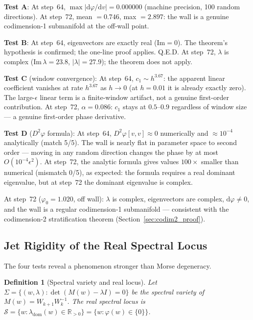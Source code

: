 \documentclass[11pt]{amsart}
\newtheorem{definition}[theorem]{Definition}
\begin{document}
\textbf{Test A}: At step~64, $\max|\mathrm{d}\varphi/\mathrm{d}v| = 0.000000$
(machine precision, 100 random directions).
At step~72, mean $= 0.746$, max $= 2.897$: the wall is a genuine
codimension-1 submanifold at the off-wall point.

\textbf{Test B}: At step~64, eigenvectors are exactly real ($\mathrm{Im} = 0$).
The theorem's hypothesis is confirmed; the one-line proof applies. Q.E.D.
At step~72, $\lambda$ is complex ($\mathrm{Im}\,\lambda = 23.8$, $|\lambda| = 27.9$);
the theorem does not apply.

\textbf{Test C} (window convergence): At step~64, $c_1 \sim h^{3.67}$:
the apparent linear coefficient vanishes at rate $h^{3.67}$ as $h \to 0$
(at $h = 0.01$ it is already exactly zero).
The large-$\epsilon$ linear term is a finite-window artifact, not a genuine
first-order contribution.
At step~72, $\alpha = 0.086$: $c_1$ stays at $0.5$--$0.9$ regardless of window
size --- a genuine first-order phase derivative.

\textbf{Test D} ($D^2\varphi$ formula): At step~64, $D^2\varphi[v,v] \approx 0$
numerically and $\approx 10^{-4}$ analytically (match 5/5).
The wall is nearly flat in parameter space to second order --- moving in any
random direction changes the phase by at most $O(10^{-4}\epsilon^2)$.
At step~72, the analytic formula gives values $100\times$ smaller than
numerical (mismatch 0/5), as expected: the formula requires a real dominant
eigenvalue, but at step~72 the dominant eigenvalue is complex.

At step~72 ($\varphi_0 = 1.020$, off wall): $\lambda$ is complex,
eigenvectors are complex, $\mathrm{d}\varphi \neq 0$, and the wall
is a regular codimension-1 submanifold --- consistent with the
codimension-2 stratification theorem (Section~\ref{sec:codim2_proof}).

\subsection{Jet Rigidity of the Real Spectral Locus}
\label{sec:jet_rigidity}

The four tests reveal a phenomenon stronger than Morse degeneracy.

\begin{definition}[Spectral variety and real locus]
Let $\Sigma = \{(w, \lambda) : \det(M(w) - \lambda I) = 0\}$
be the spectral variety of $M(w) = W_{k+1}W_k^{-1}$.
The \emph{real spectral locus} is
$\mathcal{S} = \{w : \lambda_\mathrm{dom}(w) \in \mathbb{R}_{>0}\}
= \{w : \varphi(w) \in \{0\}\}$.
\end{definition}
\end{document}
